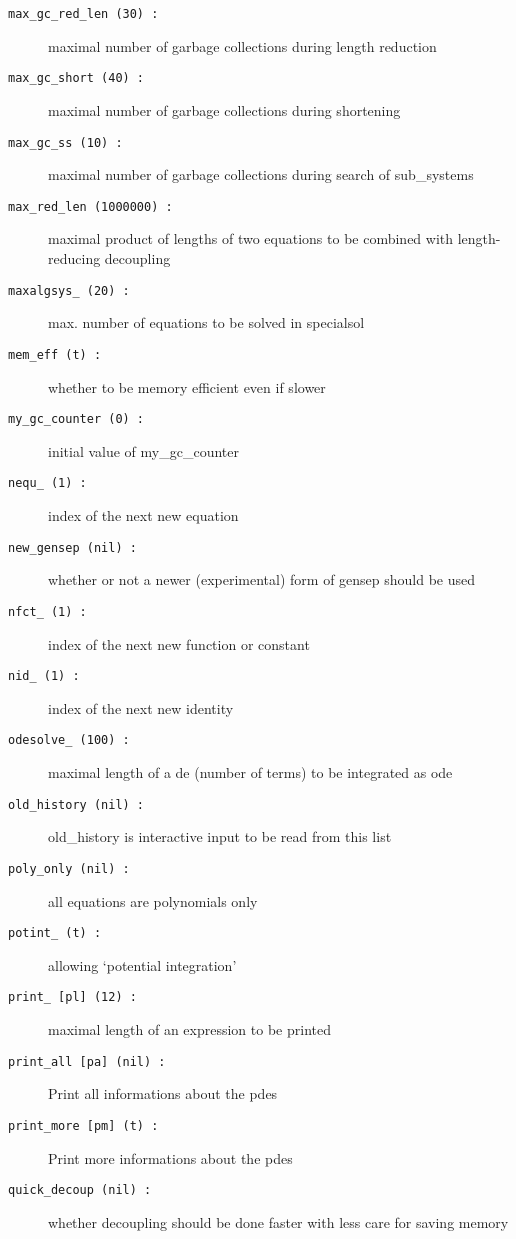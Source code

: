 \documentclass[12pt]{article}
\begin{document}
\begin{description}
\item[{\tt max\_gc\_red\_len (30) :}] maximal number of garbage collections during
                    length reduction
\item[{\tt max\_gc\_short (40) :}] maximal number of garbage collections during shortening
\item[{\tt max\_gc\_ss (10) :}] maximal number of garbage collections during
                    search of sub\_systems
\item[{\tt max\_red\_len (1000000) :}] maximal product of lengths of two
                    equations to be combined with length-reducing decoupling
\item[{\tt maxalgsys\_ (20) :}] max. number of equations to be solved
                    in specialsol
\item[{\tt mem\_eff (t) :}] whether to be memory efficient even if slower
\item[{\tt my\_gc\_counter (0) :}] initial value of my\_gc\_counter
\item[{\tt nequ\_ (1) :}] index of the next new equation
\item[{\tt new\_gensep (nil) :}] whether or not a newer (experimental)
                    form of gensep should be used
\item[{\tt nfct\_ (1) :}] index of the next new function or constant
\item[{\tt nid\_ (1) :}] index of the next new identity
\item[{\tt odesolve\_ (100) :}] maximal length of a de (number of terms) to be
                    integrated as ode
\item[{\tt old\_history (nil) :}]
                   old\_history is interactive input to be read from
                   this list
\item[{\tt poly\_only (nil) :}] all equations are polynomials only
\item[{\tt potint\_ (t) :}] allowing `potential integration'
\item[{\tt print\_ [pl] (12) :}] maximal length of an expression to be printed
\item[{\tt print\_all [pa] (nil) :}] Print all informations about the pdes
\item[{\tt print\_more [pm] (t) :}] Print more informations about the pdes
\item[{\tt quick\_decoup (nil) :}] whether decoupling should be done
                    faster with less care for saving memory

\end{description}
\end{document}
